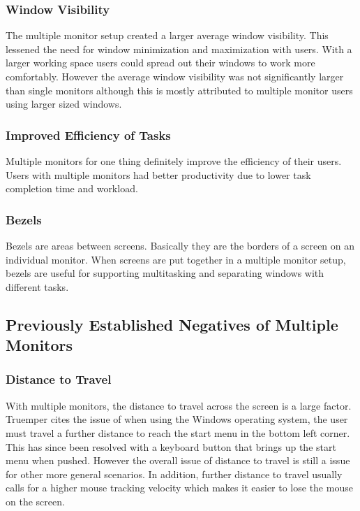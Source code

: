 \documentclass[a4paper]{article}
\begin{document}
\subsubsection{Window Visibility}
The multiple monitor setup created a larger average window visibility.\cite{Hutchings} This lessened the need for window minimization and maximization with users.\cite{Grudin} With a larger working space users could spread out their windows to work more comfortably.\cite{Truemper} However the average window visibility was not significantly larger than single monitors although this is mostly attributed to multiple monitor users using larger sized windows.\cite{Hutchings}

\subsubsection{Improved Efficiency of Tasks}
Multiple monitors for one thing definitely improve the efficiency of their users. Users with multiple monitors had better productivity due to lower task completion time and workload.\cite{Kang}

\subsubsection{Bezels}
Bezels are areas between screens.\cite{Truemper} Basically they are the borders of a screen on an individual monitor. When screens are put together in a multiple monitor setup, bezels are useful for supporting multitasking and separating windows with different tasks.



\subsection{Previously Established Negatives of Multiple Monitors}

\subsubsection{Distance to Travel}
With multiple monitors, the distance to travel across the screen is a large factor. Truemper cites the issue of when using the Windows operating system, the user must travel a further distance to reach the start menu in the bottom left corner.\cite{Truemper} This has since been resolved with a keyboard button that brings up the start menu when pushed. However the overall issue of distance to travel is still a issue for other more general scenarios.\cite{Truemper} In addition, further distance to travel usually calls for a higher mouse tracking velocity which makes it easier to lose the mouse on the screen. \cite{Truemper}
\end{document}
